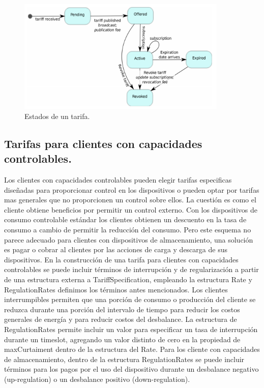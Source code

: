 \begin{figure}[h!]
	\centering
	\includegraphics[width=10cm]{img/state.png}
	\caption{Estados de un tarifa.}
	\label{state}
\end{figure}

\subsection{Tarifas para clientes con capacidades controlables.}

Los clientes con capacidades controlables pueden elegir tarifas especificas diseñadas para proporcionar control en los dispositivos o pueden optar por tarifas mas generales que no proporcionen un control sobre ellos. 
La cuestión es como el cliente obtiene beneficios por permitir un control externo. 
Con los dispositivos de consumo controlable estándar los clientes obtienen un descuento en la tasa de consumo a cambio de permitir la reducción del consumo. 
Pero este esquema no parece adecuado para clientes con dispositivos de almacenamiento, una solución es pagar o cobrar al clientes por las acciones de carga y descarga de sus dispositivos. 
En la construcción de una tarifa para clientes con capacidades controlables se puede incluir términos de interrupción y de regularización a partir de una estructura externa a TariffSpecification, empleando la estructura Rate y RegulationRates definimos los términos antes mencionados. 
Los clientes interrumpibles permiten que una porción de consumo o producción del cliente se reduzca durante una porción del intervalo de tiempo para reducir los costos generales de energía y para reducir costos del desbalance. 
La estructura de RegulationRates permite incluir un valor para especificar un tasa de interrupción durante un timeslot, agregando un valor distinto de cero en la propiedad de maxCurtaiment dentro de la estructura del Rate. 
Para los cliente con capacidades de almacenamiento, dentro de la estructura RegulationRates se puede incluir términos para los pagos por el uso del dispositivo durante un desbalance negativo (up-regulation) o un desbalance positivo (down-regulation).

